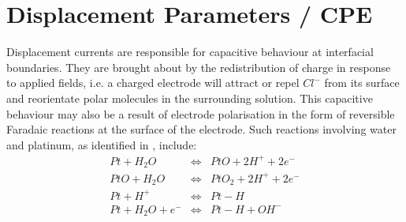 \documentclass[journal, a4paper]{IEEEtran}
\begin{document}
\section{Displacement Parameters {\color{blue}/ CPE}}
\label{sect:cpe}

Displacement currents are responsible for capacitive behaviour at interfacial boundaries.
They are brought about by the redistribution of charge in response to applied fields, i.e. a charged electrode will attract or repel $Cl^{-}$ from its surface and reorientate polar molecules in the surrounding solution.\cite{Merrill05} This capacitive behaviour may also be a result of electrode polarisation in the form of reversible Faradaic reactions at the surface of the electrode.
Such reactions involving water and platinum, as identified in \cite{Horch2004,Mohtashami2011,Merrill05}, include:
\begin{eqnarray}
    Pt + H_{2}O &\Leftrightarrow& PtO + 2 H^{+} + 2 e^{-}\\
    PtO + H_{2}O &\Leftrightarrow& PtO_{2} + 2 H^{+} + 2e^{-}\\
    Pt + H^{+} & \Leftrightarrow & Pt-H\\
    Pt + H_{2}O + e^{-} &\Leftrightarrow& Pt-H+OH^{-}
\end{eqnarray}
\end{document}
